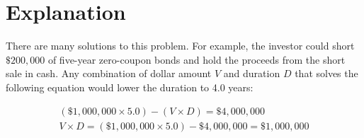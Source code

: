 \documentclass[11pt]{article}
\begin{document}
\section*{Explanation}
There are many solutions to this problem. For example, the investor could short $\$ 200,000$ of five-year zero-coupon bonds and hold the proceeds from the short sale in cash. Any combination of dollar amount $V$ and duration $D$ that solves the following equation would lower the duration to 4.0 years:

\[
\begin{gathered}
(\$ 1,000,000 \times 5.0)-(V \times D)=\$ 4,000,000 \\
V \times D=(\$ 1,000,000 \times 5.0)-\$ 4,000,000=\$ 1,000,000
\end{gathered}
\]
\end{document}
